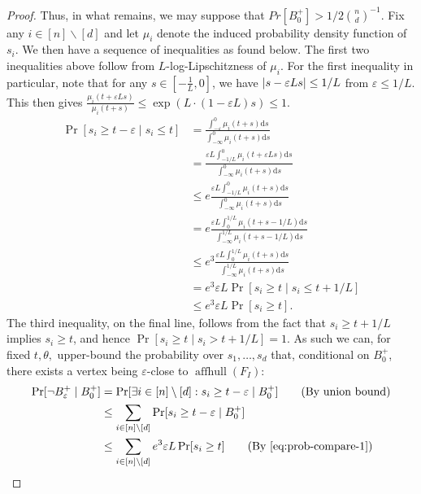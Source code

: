 \documentclass{article}\usepackage[a4paper,margin=20mm]{geometry}
\newcommand{\aff}{\operatorname{affhull}}
\newcommand{\eps}{\varepsilon} %
\renewcommand{\epsilon}{\varepsilon} %
\DeclarePairedDelimiter\abs{\lvert}{\rvert}
\begin{document}
\begin{proof}
    Thus, in what remains, we may suppose that $Pr[B_{0}^{+}] > 1/2 \binom{n}{d}^{-1}$.
    Fix any $i \in [n] \backslash [d]$ and let $\mu_i$ denote the induced probability density function of $s_i$. We then have a sequence of inequalities as found below.    
    The first two inequalities above follow from $L$-log-Lipschitzness of $\mu_i$. 
    For the first inequality in particular, note that for any $s \in [-\frac{1}{L}, 0]$,
    we have $\abs{s-\eps L s} \leq 1/L$ from $\eps \leq 1/L$.
    This then gives $\frac{\mu_i (t + \epsilon L s)}{\mu_i (t + s)} \leq \exp(L \cdot (1 - \epsilon L) s) \leq 1$.
    \begin{align}
        \Pr[ s_i \geq t - \eps \mid s_i \leq t]
        &= \frac{\int_{-\eps}^0 \mu_i(t + s) \mathrm d s}{\int_{-\infty}^0 \mu_i(t + s) \mathrm d s} \nonumber\\
        &= \frac{\eps L \int_{-1/L}^0 \mu_i(t + \eps L s) \mathrm d s}{\int_{-\infty}^0 \mu_i(t + s) \mathrm d s} \nonumber\\
        &\leq e \frac{\eps L \int_{-1/L}^0 \mu_i(t + s) \mathrm d s}{\int_{-\infty}^0 \mu_i(t + s) \mathrm d s}\nonumber \\
        &= e \frac{\eps L \int_{0}^{1/L} \mu_i(t + s - 1/L) \mathrm d s}{\int_{-\infty}^{1/L} \mu_i(t + s - 1/L) \mathrm d s}\nonumber \\
        &\leq e^3 \frac{\eps L \int_{0}^{1/L} \mu_i(t + s) \mathrm d s}{\int_{-\infty}^{1/L} \mu_i(t + s) \mathrm d s} \nonumber\\
        &= e^3 \eps L \Pr[s_i \geq t \mid s_i \leq t + 1/L] \nonumber\\
        &\leq e^3 \eps L \Pr[s_i \geq t]. \label{eq:prob-compare-1}
    \end{align}
    The third inequality, on the final line, follows from the fact that $s_i \geq t + 1/L$ implies $s_i \geq t$,
    and hence $\Pr[s_i \geq t \mid s_i > t+1/L] = 1$.
    As such we can, for fixed $t,\theta,$ upper-bound the probability over $s_1,\dots,s_d$ that,
    conditional on $B_0^+$, there exists a vertex being $\epsilon$-close to $\aff(F_I)$:
    \begin{align}
        \Pr[\neg B_\eps^+\mid B_0^+]
    &= \Pr[\exists i \in [n]\setminus [d] : s_i \geq t - \eps \mid B_0^+] \nonumber \tag{By union bound} \\
    &\leq \sum_{i \in [n] \setminus [d]} \Pr[s_i \geq t - \eps \mid B_0^+] \nonumber \\
    &\leq \sum_{i \in [n] \setminus [d]} e^3 \eps L \Pr[s_i \geq t ] \tag{By \eqref{eq:prob-compare-1}} \nonumber \\

\end{align}
\end{proof}
\end{document}
